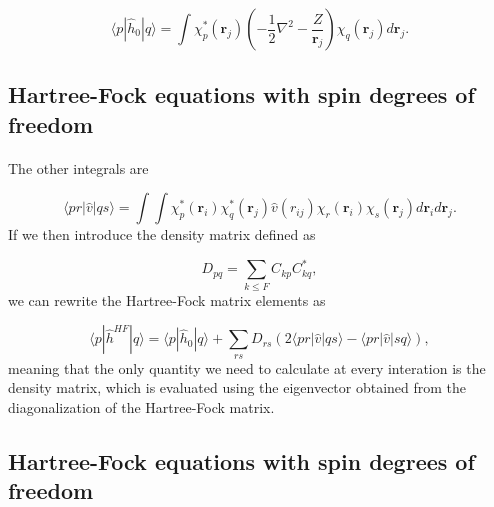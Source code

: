 \documentclass[%
twoside,                 %
final,                   %
10pt]{article}
\begin{document}
\[
\langle p|\hat{h}_0|q\rangle = \int \chi_{p}^*(\mathbf{r}_j)\left(-\frac{1}{2}\nabla^2-\frac{Z}{\mathbf{r}_j}  \right)\chi_{q}(\mathbf{r}_j)
  d\mathbf{r}_j.
\]



\subsection*{Hartree-Fock equations with spin degrees of freedom}

\paragraph{}

The other integrals are

\begin{equation*}
\langle pr | \hat{v}|qs\rangle = \int\int \chi_{p}^*(\mathbf{r}_i)\chi_{q}^*(\mathbf{r}_j)\hat{v}(r_{ij})\chi_{r}(\mathbf{r}_i)\chi_{s}(\mathbf{r}_j)
  d\mathbf{r}_id\mathbf{r}_j.
\end{equation*}
If we then introduce the density matrix defined as

\begin{equation*}
D_{pq}=\sum_{k\le F}C_{kp}C_{kq}^*,
\end{equation*}
we can rewrite the Hartree-Fock matrix elements as

\begin{equation*}
\langle p | \hat{h}^{HF} | q \rangle = \langle p|\hat{h}_0|q\rangle +\sum_{rs}D_{rs}\left(2\langle pr | \hat{v}|qs\rangle-\langle pr | \hat{v}|sq\rangle\right),
\end{equation*}
meaning that the only quantity we need to calculate at every
interation is the density matrix, which is evaluated using the eigenvector 
obtained from the diagonalization of the Hartree-Fock matrix.



\subsection*{Hartree-Fock equations with spin degrees of freedom}

\paragraph{}
\end{document}

